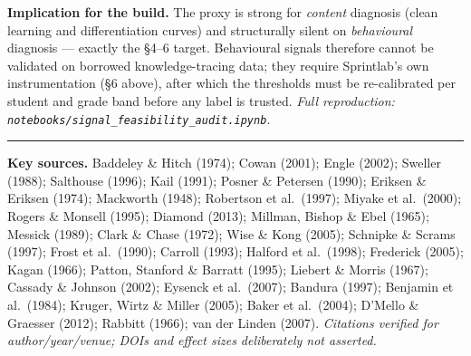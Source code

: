 \documentclass[10pt]{article}
\begin{document}
\vspace{3pt}
\textbf{Implication for the build.} The proxy is strong for \emph{content} diagnosis (clean learning and differentiation curves) and structurally silent on \emph{behavioural} diagnosis --- exactly the \S4--6 target. Behavioural signals therefore cannot be validated on borrowed knowledge-tracing data; they require Sprintlab's own instrumentation (\S6 above), after which the thresholds must be re-calibrated per student and grade band before any label is trusted. \emph{Full reproduction: \texttt{notebooks/signal\_feasibility\_audit.ipynb}.}

{\scriptsize\vspace{4pt}\hrule\vspace{2pt}
\textbf{Key sources.} Baddeley \& Hitch (1974); Cowan (2001); Engle (2002); Sweller (1988); Salthouse (1996); Kail (1991); Posner \& Petersen (1990); Eriksen \& Eriksen (1974); Mackworth (1948); Robertson et al.\ (1997); Miyake et al.\ (2000); Rogers \& Monsell (1995); Diamond (2013); Millman, Bishop \& Ebel (1965); Messick (1989); Clark \& Chase (1972); Wise \& Kong (2005); Schnipke \& Scrams (1997); Frost et al.\ (1990); Carroll (1993); Halford et al.\ (1998); Frederick (2005); Kagan (1966); Patton, Stanford \& Barratt (1995); Liebert \& Morris (1967); Cassady \& Johnson (2002); Eysenck et al.\ (2007); Bandura (1997); Benjamin et al.\ (1984); Kruger, Wirtz \& Miller (2005); Baker et al.\ (2004); D'Mello \& Graesser (2012); Rabbitt (1966); van der Linden (2007). \emph{Citations verified for author/year/venue; DOIs and effect sizes deliberately not asserted.}}
\end{document}

